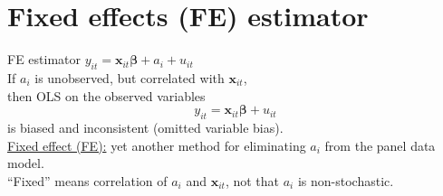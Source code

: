 \documentclass[usenames,dvipsnames]{beamer}
\begin{document}
\section{Fixed effects (FE) estimator}
\begin{frame}{FE estimator}
$y_{it} = \bm{x}_{it} \bm{\beta} + a_i + u_{it}$\\
\bigskip
If $a_i$ is unobserved, but correlated with $\bm{x}_{it}$, \\ then OLS on the observed variables 
$$y_{it} = \bm{x}_{it} \bm{\beta} + u_{it}$$
is biased and inconsistent (omitted variable bias).\\
\vspace{0.5cm}
\underline{Fixed effect (FE):} yet another method for eliminating $a_i$ from the panel data model.\\
\vspace{0.5cm}
``Fixed'' means correlation of $a_i$ and $\bm{x}_{it}$, not that $a_i$ is non-stochastic.
\end{frame}
\end{document}
